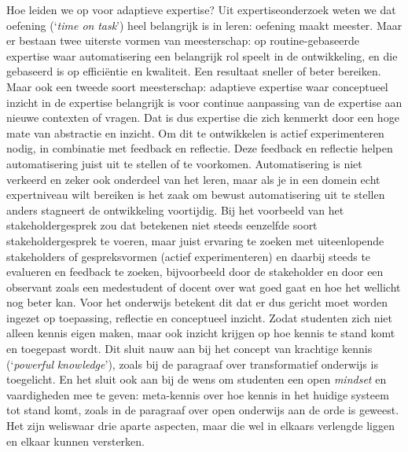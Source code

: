 \documentclass[smallauthor, chapterhaspagenum, nochapterinheader, pagenuminheader,  bigchapnum,medium2, tocpages, garamond, titleinheader]{jote-book}
\begin{document}
	\enlargethispage{-\baselineskip}\checkandfixthelayout

	Hoe leiden we op voor adaptieve expertise? Uit expertiseonderzoek weten we dat oefening (‘\emph{time on }\emph{task}') heel belangrijk is in leren: oefening maakt meester. Maar er bestaan twee uiterste vormen van meesterschap: op routine-gebaseerde expertise waar automatisering een belangrijk rol speelt in de ontwikkeling, en die gebaseerd is op efficiëntie en kwaliteit. Een resultaat sneller of beter bereiken. Maar ook een tweede soort meesterschap: adaptieve expertise waar conceptueel inzicht in de expertise belangrijk is voor continue aanpassing van de expertise aan nieuwe contexten of vragen. Dat is dus expertise die zich kenmerkt door een hoge mate van abstractie en inzicht. Om dit te ontwikkelen is actief experimenteren nodig, in combinatie met feedback en reflectie. Deze feedback en reflectie helpen automatisering juist uit te stellen of te voorkomen. Automatisering is niet verkeerd en zeker ook onderdeel van het leren, maar als je in een domein echt expertniveau wilt bereiken is het zaak om bewust automatisering uit te stellen anders stagneert de ontwikkeling voortijdig. Bij het voorbeeld van het stakeholdergesprek zou dat betekenen niet steeds eenzelfde soort stakeholdergesprek te voeren, maar juist ervaring te zoeken met uiteenlopende stakeholders of gespreksvormen (actief experimenteren) en daarbij steeds te evalueren en feedback te zoeken, bijvoorbeeld door de stakeholder en door een observant zoals een medestudent of docent over wat goed gaat en hoe het wellicht nog beter kan. Voor het onderwijs betekent dit dat er dus gericht moet worden ingezet op toepassing, reflectie en conceptueel inzicht. Zodat studenten zich niet alleen kennis eigen maken, maar ook inzicht krijgen op hoe kennis te stand komt en toegepast wordt. Dit sluit nauw aan bij het concept van krachtige kennis (‘\emph{powerful}\emph{ }\emph{knowledge}'), zoals bij de paragraaf over transformatief onderwijs is toegelicht. En het sluit ook aan bij de wens om studenten een open \emph{mindset} en vaardigheden mee te geven: meta-kennis over hoe kennis in het huidige systeem tot stand komt, zoals in de paragraaf over open onderwijs aan de orde is geweest. Het zijn weliswaar drie aparte aspecten, maar die wel in elkaars verlengde liggen en elkaar kunnen versterken.
\end{document}
